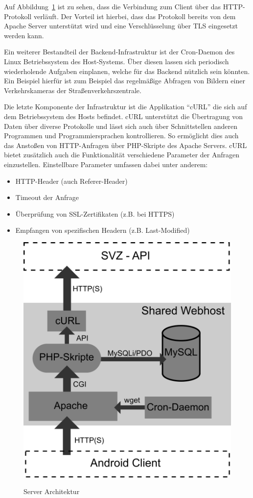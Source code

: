 Auf Abbildung~\ref{fig:serverarch} ist zu sehen, dass die Verbindung zum Client über das HTTP-Protokoll verläuft. 
Der Vorteil ist hierbei, dass das Protokoll bereits von dem Apache Server unterstützt wird und eine Verschlüsselung über TLS eingesetzt werden kann.

Ein weiterer Bestandteil der Backend-Infrastruktur ist der Cron-Daemon des Linux Betriebssystem des Host-Systems.
Über diesen lassen sich periodisch wiederholende Aufgaben einplanen, welche für das Backend nützlich sein könnten.
Ein Beispiel hierfür ist zum Beispiel das regelmäßige Abfragen von Bildern einer Verkehrskameras der Straßenverkehrszentrale.

Die letzte Komponente der Infrastruktur ist die Applikation "`cURL"' die sich auf dem Betriebssystem des Hosts befindet.
cURL unterstützt die Übertragung von Daten über diverse Protokolle und lässt sich auch über Schnittstellen anderen Programmen und Programmiersprachen kontrollieren.
So ermöglicht dies auch das Anstoßen von HTTP-Anfragen über PHP-Skripte des Apache Servers.
cURL bietet zusätzlich auch die Funktionalität verschiedene Parameter der Anfragen einzustellen.
Einstellbare Parameter umfassen dabei unter anderem:
\begin{itemize}
\item{HTTP-Header (auch Referer-Header)}
\item{Timeout der Anfrage}
\item{Überprüfung von SSL-Zertifikaten (z.B. bei HTTPS)}
\item{Empfangen von spezifischen Headern (z.B. Last-Modified)}
\end{itemize}
\begin{figure}[hp]
   \centering
     \includegraphics[width=13cm]{Bilder/server-arch} \\
 \caption{Server Architektur}
 \label{fig:serverarch}
\end{figure}
\newpage

